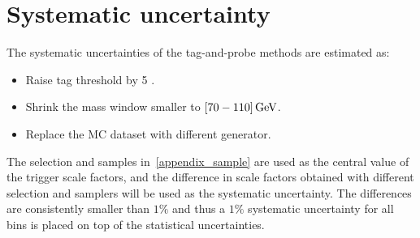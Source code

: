 \section{Systematic uncertainty}
The systematic uncertainties of the tag-and-probe methods are estimated as: 
\begin{itemize}
    \item Raise tag \PT threshold by 5 \GeV.
    \item Shrink the \PZ mass window smaller to $[70-110] \,\text{Ge\hspace{-.08em}V}$.
    \item Replace the MC dataset with different generator.
\end{itemize}
The selection and samples in~\ref{appendix_sample} are used as the central value of the trigger scale factors, and the difference in scale factors obtained with different selection and samplers will be used as the systematic uncertainty.
The differences are consistently smaller than $1\%$ and thus a $1\%$ systematic uncertainty for all bins is placed on top of the statistical uncertainties.
